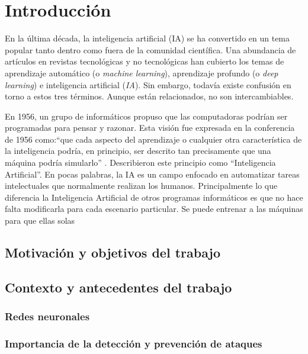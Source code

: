 \chapter{Introducción} \label{Capitulo 1}
      
En la última década, la inteligencia artificial (IA) se ha convertido en un tema popular tanto dentro como fuera de la comunidad científica. Una abundancia de artículos en revistas tecnológicas y no tecnológicas han cubierto los temas de aprendizaje automático (o \textit{machine learning}), aprendizaje profundo (o \textit{deep learning}) e inteligencia artificial (\textit{IA}). Sin embargo, todavía existe confusión en torno a estos tres términos. Aunque están relacionados, no son intercambiables.

En 1956, un grupo de informáticos propuso que las computadoras podrían ser programadas para pensar y razonar. Esta visión fue expresada en la conferencia de 1956 \citep{moor2006dartmouth} como:``que cada aspecto del aprendizaje o cualquier otra característica de la inteligencia podría, en principio, ser descrito tan precisamente que una máquina podría simularlo'' . Describieron este principio como ``Inteligencia Artificial''. En pocas palabras, la IA es un campo enfocado en automatizar tareas intelectuales que normalmente realizan los humanos. Principalmente lo que diferencia la Inteligencia Artificial de otros programas informáticos es que no hace falta modificarla para cada escenario particular. Se puede entrenar a las máquinas para que ellas solas 


\section{Motivación y objetivos del trabajo} \label{Sec:1_1}

    
\section{Contexto y antecedentes del trabajo} \label{Sec:1_2}

\subsection{Redes neuronales} \label{Subsubsec: 1_2_1}
  
\subsection{Importancia de la detección y prevención de ataques} \label{Subsec: 1_2_2}

